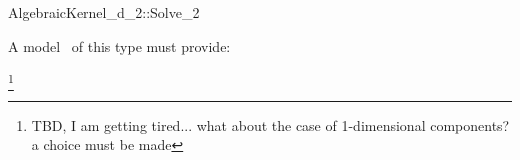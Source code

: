 \begin{ccRefConcept}{AlgebraicKernel_d_2::Solve_2}

\ccDefinition


A model \ccVar\ of this type must provide:

\footnote{TBD, I am getting tired... what about the case of 1-dimensional components? a choice must be made}

\end{ccRefConcept}
